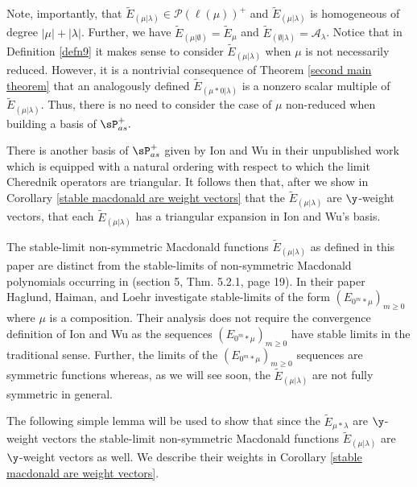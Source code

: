 \begin{rema}
     Note, importantly, that $\widetilde{E}_{(\mu|\lambda)} \in \mathscr{P}(\ell(\mu))^{+}$ and $\widetilde{E}_{(\mu|\lambda)}$ is homogeneous of degree $|\mu| + |\lambda|$. Further, we have $\widetilde{E}_{(\mu|\emptyset)} = \widetilde{E}_{\mu}  $ and $\widetilde{E}_{(\emptyset |\lambda)} = \mathcal{A}_{\lambda}$. Notice that in Definition \ref{defn9} it makes sense to consider $\widetilde{E}_{(\mu|\lambda)}$ when $\mu$ is not necessarily reduced. However, it is a nontrivial consequence of Theorem \ref{second main theorem} that an analogously defined $\widetilde{E}_{(\mu*0|\lambda)}$ is a nonzero scalar multiple of $\widetilde{E}_{(\mu|\lambda)}.$ Thus, there is no need to consider the case of $\mu$ non-reduced when building a basis of $\sP_{as}^{+}.$

     There is another basis of $\sP_{as}^{+}$ given by Ion and Wu in their unpublished work \cite{IW_2022} which is equipped with a natural ordering with respect to which the limit Cherednik operators are triangular. It follows then that, after we show in Corollary \ref{stable macdonald are weight vectors} that the $\widetilde{E}_{(\mu|\lambda)}$ are $\y$-weight vectors, that each $\widetilde{E}_{(\mu|\lambda)}$ has a triangular expansion in Ion and Wu's basis.
\end{rema}

\begin{rema}
    The stable-limit non-symmetric Macdonald functions $\widetilde{E}_{(\mu|\lambda)}$ as defined in this paper are distinct from the stable-limits of non-symmetric Macdonald polynomials occurring in \cite{haglund2007combinatorial} (section 5, Thm. 5.2.1, page 19). In their paper Haglund, Haiman, and Loehr investigate stable-limits of the form $(E_{0^m* \mu})_{m \geq 0}$ where $\mu$ is a composition. Their analysis does not require the convergence definition of Ion and Wu as the sequences $(E_{0^m* \mu})_{m \geq 0}$ have stable limits in the traditional sense. Further, the limits of the $(E_{0^m* \mu})_{m \geq 0}$ sequences are symmetric functions whereas, as we will see soon, the $\widetilde{E}_{(\mu|\lambda)}$ are not fully symmetric in general. 
\end{rema}

The following simple lemma will be used to show that since the $\widetilde{E}_{\mu*\lambda}$ are $\y$-weight vectors the stable-limit non-symmetric Macdonald functions $\widetilde{E}_{(\mu|\lambda)}$ are $\y$-weight vectors as well. We describe their weights in Corollary \ref{stable macdonald are weight vectors}.

